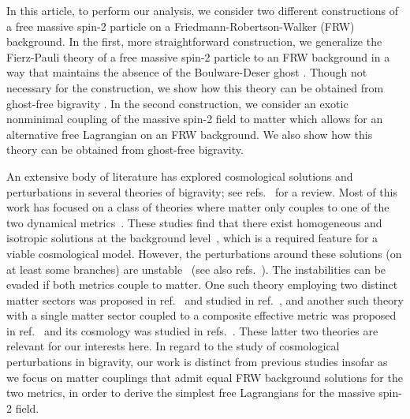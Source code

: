 \documentclass[11pt,a4paper]{article}
\newcommand{\rref}[1]{ref.~\cite{#1}}
\begin{document}
In this article, to perform our analysis, we consider two different constructions of a free massive spin-2 particle on a Friedmann-Robertson-Walker (FRW) background. In the first, more straightforward construction, we generalize the Fierz-Pauli theory \cite{Fierz:1939ix} of a free massive spin-2 particle to an FRW background in a way that maintains the absence of the Boulware-Deser ghost \cite{Boulware:1972yco}.  Though not necessary for the construction, we show how this theory can be obtained from ghost-free bigravity \cite{Hassan:2011zd}.  In the second construction, we consider an exotic nonminimal coupling \cite{deRham:2014naa} of the massive spin-2 field to matter which allows for an alternative free Lagrangian on an FRW background.  We also show how this theory can be obtained from ghost-free bigravity.

An extensive body of literature has explored cosmological solutions and perturbations in several theories of bigravity; see refs.~\cite{DeFelice:2013bxa,deRham:2014zqa} for a review.  
Most of this work has focused on a class of theories where matter only couples to one of the two dynamical metrics~\cite{Hassan:2011zd}.  These studies find that there exist homogeneous and isotropic solutions at the background level~\cite{Volkov:2011an,vonStrauss:2011mq,Comelli:2011zm,Volkov:2012cf,Akrami:2012vf,Koennig:2013fdo}, which is a required feature for a viable cosmological model.  However, the perturbations around these solutions (on at least some branches) are unstable~\cite{Comelli:2012db} (see also refs.~\cite{Koennig:2014ods,Lagos:2014lca,Akrami:2015qga}).  
The instabilities can be evaded if both metrics couple to matter.  One such theory employing two distinct matter sectors was proposed in \rref{Comelli:2012db} and studied in \rref{Comelli:2014bqa}, and another such theory with a single matter sector coupled to a composite effective metric was proposed in \rref{deRham:2014naa} and its cosmology was studied in refs.~\cite{Enander:2014xga,EmirGumrukcuoglu:2014uog,Gumrukcuoglu:2015nua}.  These latter two theories are relevant for our interests here.  In regard to the study of cosmological perturbations in bigravity, our work is distinct from previous studies insofar as we focus on matter couplings that admit equal FRW background solutions for the two metrics, in order to derive the simplest free Lagrangians for the massive spin-2 field.  
\end{document}
